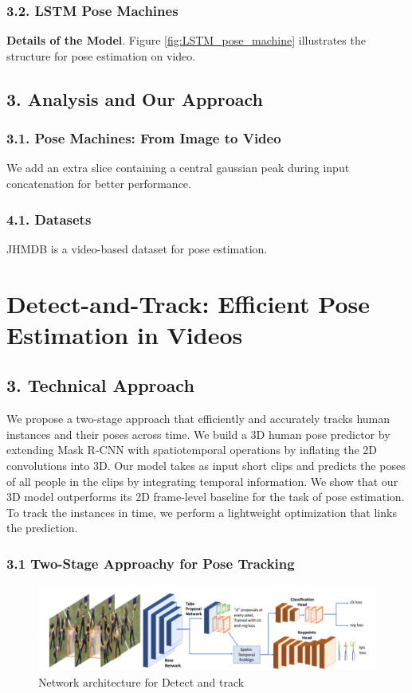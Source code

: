 \documentclass[a4paper]{report}
\begin{document}
\subsection*{3.2. LSTM Pose Machines}
\textbf{Details of the Model}.
Figure \ref{fig:LSTM_pose_machine} illustrates the structure for pose estimation on video.

\section*{3. Analysis and Our Approach}
\subsection*{3.1. Pose Machines: From Image to Video}
We add an extra slice containing a central gaussian peak during input concatenation for better performance.

\subsection*{4.1. Datasets}
JHMDB is a video-based dataset for pose estimation.

\chapter*{Detect-and-Track: Efficient Pose Estimation in Videos}

\section*{3. Technical Approach}
We propose a two-stage approach that efficiently and accurately tracks human instances and their poses across time. We build a 3D human pose predictor by extending Mask R-CNN with spatiotemporal operations by inflating the 2D convolutions into 3D. Our model takes as input short clips and predicts the poses of all people in the clips by integrating temporal information. We show that our 3D model outperforms its 2D frame-level baseline for the task of pose estimation. To track the instances in time, we perform a lightweight optimization that links the prediction. 

\subsection*{3.1 Two-Stage Approachy for Pose Tracking}
\begin{figure}[h]
    \centering
    \includegraphics[width=0.8 \textwidth]{./entities/Detect_and_track.PNG}
    \caption{Network architecture for Detect and track}
    \label{fig:Detect_and_track}
\end{figure}
\end{document}
